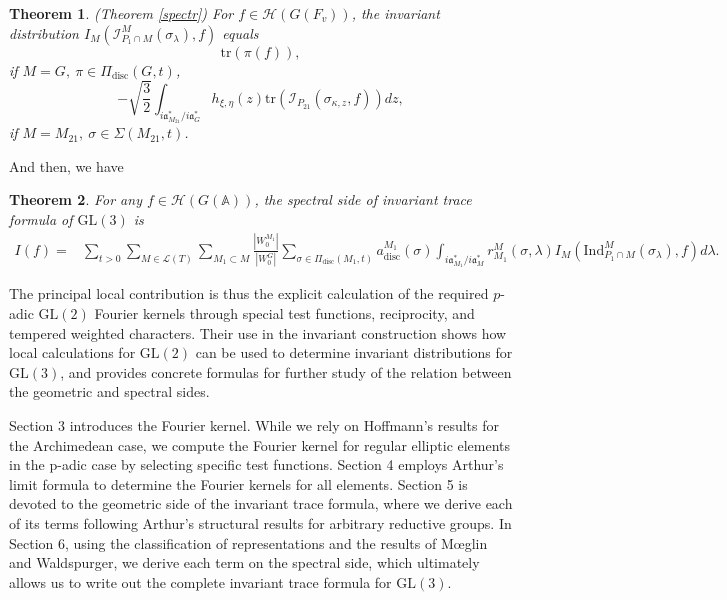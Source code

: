 \documentclass[11pt]{amsart}
\newtheorem {theorem}    {Theorem}[section]
\renewcommand{\rm}{\mathrm}
\newcommand{\GGL}{\mathrm{GL}}
\theoremstyle{definition}
\numberwithin{equation}{section}
\begin{document}
    \begin{theorem}(Theorem \ref{spectr})
        For \(f\in\mathcal{H}(G(F_v))\), the invariant distribution \(I_M \left( \mathscr{I}_{P_1\cap M}^M(\sigma_\lambda), f \right)\) equals
\[ \rm{tr}({\pi}(f)),\]if \(M=G,\ \pi\in \Pi_{\rm{disc}}(G,t)\),\[-\sqrt{\frac{3}{2}}\int_{i\mathfrak{a}_{M_{21}}^*/i\mathfrak{a}_G^*}h_{\xi,\eta}(z)\rm{tr}(\mathscr{I}_{P_{21}}(\sigma_{\kappa,z},f))dz,\]if \(M=M_{21},\ \sigma\in\Sigma(M_{21},t)\).
    \end{theorem}
    And then, we have 
    \begin{theorem}\label{main3}
        For any \(f\in \mathcal{H}(G(\mathbb{A}))\), the spectral side of invariant trace formula of \(\GGL(3)\) is 
        \begin{align*}
		I(f) = & \sum_{t>0}\sum_{M \in \mathcal{L}(T)} \sum_{M_1 \subset M}\frac{|W_0^{M_1}|}{|W_0^G|} \sum_{\sigma \in \Pi_{\mathrm{disc}}(M_1, t)} a_{\mathrm{disc}}^{M_1}(\sigma)\int_{i\mathfrak{a}_{M_1}^* / i\mathfrak{a}_M^*} r_{M_1}^M(\sigma, \lambda) I_M \left( \mathrm{Ind}_{P_1\cap M}^M(\sigma_\lambda), f \right) d\lambda.
	\end{align*}
    \end{theorem}
	
	The principal local contribution is thus the explicit calculation of the required \(p\)-adic \(\mathrm{GL}(2)\) Fourier kernels through special test functions, reciprocity, and tempered weighted characters. Their use in the invariant construction shows how local calculations for \(\mathrm{GL}(2)\) can be used to determine invariant distributions for \(\mathrm{GL}(3)\), and provides concrete formulas for further study of the relation between the geometric and spectral sides.
    
	
	
	Section 3 introduces the Fourier kernel. While we rely on Hoffmann's results for the Archimedean case, we compute the Fourier kernel for regular elliptic elements in the 
p-adic case by selecting specific test functions. Section 4 employs Arthur's limit formula to determine the Fourier kernels for all elements. Section 5 is devoted to the geometric side of the invariant trace formula, where we derive each of its terms following Arthur's structural results for arbitrary reductive groups. In Section 6, using the classification of representations and the results of Mœglin and Waldspurger, we derive each term on the spectral side, which ultimately allows us to write out the complete invariant trace formula for \(\GGL(3)\).
\end{document}
